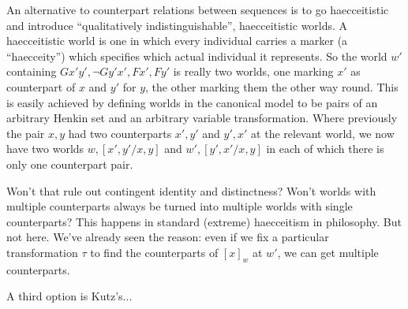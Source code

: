 \documentclass[11pt]{woarticle}
\newcommand{\cmnt}[1]{\iffalse #1 \fi}
\theoremstyle{break}
\theoremstyle{nonumberplain}
\newcommand{\SAT}{\Vdash}
\newcommand{\1}{\;\,|\;\,}
\begin{document}
{  An alternative to counterpart relations between sequences is to go
  haecceitistic and introduce ``qualitatively indistinguishable'', haecceitistic
  worlds. A haecceitistic world is one in which every individual carries a
  marker (a ``haecceity'') which specifies which actual individual it
  represents. So the world $w'$ containing $Gx'y', \neg Gy'x', Fx', Fy'$ is
  really two worlds, one marking $x'$ as counterpart of $x$ and $y'$ for $y$,
  the other marking them the other way round. This is easily achieved by
  defining worlds in the canonical model to be pairs of an arbitrary Henkin set
  and an arbitrary variable transformation. Where previously the pair $x,y$ had
  two counterparts $x',y'$ and $y',x'$ at the relevant world, we now have two
  worlds $w,[x',y'/x,y]$ and $w',[y',x'/x,y]$ in each of which there is only one
  counterpart pair.

  Won't that rule out contingent identity and distinctness? Won't worlds with
  multiple counterparts always be turned into multiple worlds with single
  counterparts? This happens in standard (extreme) haecceitism in philosophy.
  But not here. We've already seen the reason: even if we fix a particular
  transformation $\tau$ to find the counterparts of $[x]_w$ at $w'$, we can get
  multiple counterparts.

  A third option is Kutz's...


}


\cmnt{

  The fact that we need only consider the image $V^\tau$ doesn't mean that
  there's a ``canonical counterpart'' for each object. Rather, there's a single
  such counterpart for each \emph{name} of each object. For instance,
  $w,V \SAT x\!=\!y \land \Diamond x\!\not=\!y$ iff there is an accessible world
  $w'$ with $[x^\tau]_{w'} \not= [y^\tau]_{w'}$.

}
\end{document}
